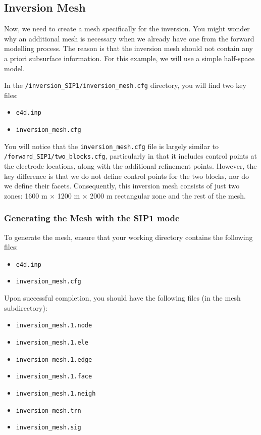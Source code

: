 \documentclass[a4paper,12pt]{article}
\begin{document}
\subsection{Inversion Mesh}

Now, we need to create a mesh specifically for the inversion. You might wonder
why an additional mesh is necessary when we already have one from the forward
modelling process. The reason is that the inversion mesh should not contain any
a priori subsurface information. For this example, we will use a simple
half-space model.

In the \texttt{/inversion\_SIP1/inversion\_mesh.cfg} directory, you will find
two key files:

\begin{itemize}
    \item \texttt{e4d.inp}
    \item \texttt{inversion\_mesh.cfg}
\end{itemize}

You will notice that the \texttt{inversion\_mesh.cfg} file is largely similar
to \newline \texttt{/forward\_SIP1/two\_blocks.cfg}, particularly in that it
includes control points at the electrode locations, along with the additional
refinement points. However, the key difference is that we do not define control
points for the two blocks, nor do we define their facets. Consequently, this
inversion mesh consists of just two zones: 1600 m × 1200 m × 2000 m rectangular
zone and the rest of the mesh.

\subsubsection{Generating the Mesh with the SIP1 mode}

To generate the mesh, ensure that your working directory contains the following
files:

\begin{itemize}
    \item \texttt{e4d.inp}
    \item \texttt{inversion\_mesh.cfg}
\end{itemize}

Upon successful completion, you should have the following files (in the mesh subdirectory):

\begin{itemize}
    \item \texttt{inversion\_mesh.1.node}
    \item \texttt{inversion\_mesh.1.ele}
    \item \texttt{inversion\_mesh.1.edge}
    \item \texttt{inversion\_mesh.1.face}
    \item \texttt{inversion\_mesh.1.neigh}
    \item \texttt{inversion\_mesh.trn}
    \item \texttt{inversion\_mesh.sig}
\end{itemize}
\end{document}
